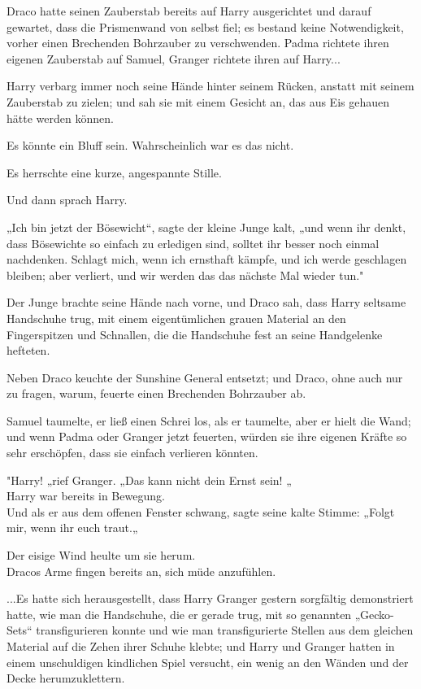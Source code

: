 {Draco hatte seinen Zauberstab bereits auf Harry ausgerichtet und darauf gewartet, dass die Prismenwand von selbst fiel; es bestand keine Notwendigkeit, vorher einen Brechenden Bohrzauber zu verschwenden. Padma richtete ihren eigenen Zauberstab auf Samuel, Granger richtete ihren auf Harry...

Harry verbarg immer noch seine Hände hinter seinem Rücken, anstatt mit seinem Zauberstab zu zielen; und sah sie mit einem Gesicht an, das aus Eis gehauen hätte werden können.

Es könnte ein Bluff sein. Wahrscheinlich war es das nicht.

Es herrschte eine kurze, angespannte Stille.

Und dann sprach Harry.

„Ich bin jetzt der Bösewicht“, sagte der kleine Junge kalt, „und wenn ihr denkt, dass Bösewichte so einfach zu erledigen sind, solltet ihr besser noch einmal nachdenken. Schlagt mich, wenn ich ernsthaft kämpfe, und ich werde geschlagen bleiben; aber verliert, und wir werden das das nächste Mal wieder tun."

Der Junge brachte seine Hände nach vorne, und Draco sah, dass Harry seltsame Handschuhe trug, mit einem eigentümlichen grauen Material an den Fingerspitzen und Schnallen, die die Handschuhe fest an seine Handgelenke hefteten.

Neben Draco keuchte der Sunshine General entsetzt; und Draco, ohne auch nur zu fragen, warum, feuerte einen Brechenden Bohrzauber ab.

Samuel taumelte, er ließ einen Schrei los, als er taumelte, aber er hielt die Wand; und wenn Padma oder Granger jetzt feuerten, würden sie ihre eigenen Kräfte so sehr erschöpfen, dass sie einfach verlieren könnten.

"Harry! „rief Granger. „Das kann nicht dein Ernst sein! „\\ Harry war bereits in Bewegung.\\ Und als er aus dem offenen Fenster schwang, sagte seine kalte Stimme: „Folgt mir, wenn ihr euch traut.„

Der eisige Wind heulte um sie herum.\\ Dracos Arme fingen bereits an, sich müde anzufühlen.

...Es hatte sich herausgestellt, dass Harry Granger gestern sorgfältig demonstriert hatte, wie man die Handschuhe, die er gerade trug, mit so genannten „Gecko-Sets“ transfigurieren konnte und wie man transfigurierte Stellen aus dem gleichen Material auf die Zehen ihrer Schuhe klebte; und Harry und Granger hatten in einem unschuldigen kindlichen Spiel versucht, ein wenig an den Wänden und der Decke herumzuklettern.

}
